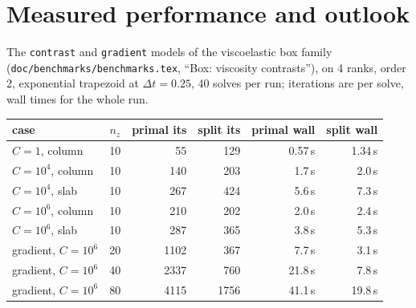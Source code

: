\documentclass[11pt]{article}
\numberwithin{equation}{section}
\theoremstyle{remark}
\newcommand{\code}[1]{\texttt{#1}}
\begin{document}
\section{Measured performance and outlook}
\label{sec:results}

The \code{contrast} and \code{gradient} models of the viscoelastic box
family (\code{doc/benchmarks/benchmarks.tex}, ``Box: viscosity contrasts''), on 4
ranks, order 2, exponential trapezoid at $\Delta t = 0.25$, 40 solves per
run; iterations are per solve, wall times for the whole run.
\begin{center}
\small
\begin{tabular}{@{}lrrrrr@{}}
\toprule
case & $n_z$ & primal its & split its & primal wall & split wall \\
\midrule
$C = 1$, column & 10 & 55 & 129 & 0.57\,s & 1.34\,s \\
$C = 10^4$, column & 10 & 140 & 203 & 1.7\,s & 2.0\,s \\
$C = 10^4$, slab & 10 & 267 & 424 & 5.6\,s & 7.3\,s \\
$C = 10^6$, column & 10 & 210 & 202 & 2.0\,s & 2.4\,s \\
$C = 10^6$, slab & 10 & 287 & 365 & 3.8\,s & 5.3\,s \\
gradient, $C = 10^6$ & 20 & 1102 & 367 & 7.7\,s & 3.1\,s \\
gradient, $C = 10^6$ & 40 & 2337 & 760 & 21.8\,s & 7.8\,s \\
gradient, $C = 10^6$ & 80 & 4115 & 1756 & 41.1\,s & 19.8\,s \\
\bottomrule
\end{tabular}
\end{center}
\end{document}
